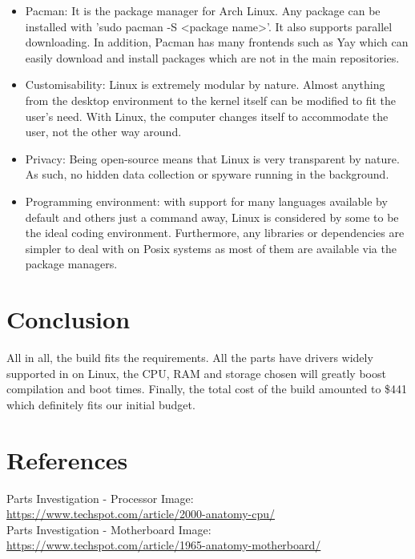 \documentclass[12pt, a4paper]{article}
\begin{document}
\begin{itemize}
  \item Pacman: It is the package manager for Arch Linux. Any package can 
    be installed with 'sudo pacman -S <package name>'. It also supports 
    parallel downloading. In addition, Pacman has many frontends such 
    as Yay which can easily download and install packages which are
    not in the main repositories.
  \item Customisability: Linux is extremely modular by nature. Almost
    anything from the desktop environment to the kernel itself can
    be modified to fit the user's need. With Linux, the computer changes
    itself to accommodate the user, not the other way around.
  \item Privacy: Being open-source means that Linux is very transparent
    by nature. As such, no hidden data collection or spyware running in 
    the background.
  \item Programming environment: with support for many languages available
    by default and others just a command away, Linux is considered
    by some to be the ideal coding environment. Furthermore, any libraries
    or dependencies are simpler to deal with on Posix systems as most 
    of them are available via the package managers.
\end{itemize}


\section{Conclusion}
All in all, the build fits the requirements. All the parts have drivers
widely supported in on Linux, the CPU, RAM and storage chosen will
greatly boost compilation and boot times. Finally, the total cost
of the build amounted to \$441 which definitely fits our initial budget.

\section{References}
Parts Investigation - Processor Image: \\
\url{https://www.techspot.com/article/2000-anatomy-cpu/} \\
Parts Investigation - Motherboard Image: \\
\url{https://www.techspot.com/article/1965-anatomy-motherboard/} \\
\end{document}
